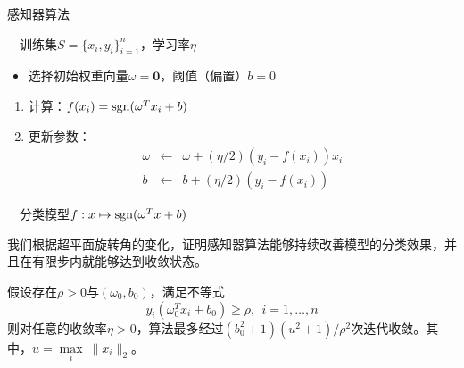 \begin{algorithm}[htbp]
        \caption{感知器算法}
        \begin{algorithmic}
            \REQUIRE ~~训练集$S=\{x_i,y_i\}_{i=1}^n$，学习率$\eta$ \\
            \STATE
            \begin{itemize}
              \item 选择初始权重向量$\omega=\mathbf{0}$，阈值（偏置）$b=0$
            \end{itemize}
            \REPEAT
            \STATE
            \begin{enumerate}
              \item 计算：$f(x_i) = \operatorname{\mathrm{sgn}}(\omega^T x_i + b)$
              \item 更新参数：
              \begin{equation}
                \begin{array}{lcl}
                  \omega & \leftarrow & \omega + (\eta/2) (y_i - f(x_i)) x_i\\
                  b & \leftarrow & b + (\eta/2) (y_i - f(x_i))
                \end{array}
              \end{equation}
            \end{enumerate}
            \ENDFOR
            \ENSURE ~~分类模型$f:x\mapsto \operatorname{\mathrm{sgn}}(\omega^T x + b)$
        \end{algorithmic}
\end{algorithm}

我们根据超平面旋转角的变化，证明感知器算法能够持续改善模型的分类效果，并且在有限步内就能够达到收敛状态。
\begin{theorem}
假设存在$\rho>0$与$(\omega_0,b_0)$，满足不等式
\begin{equation}
    y_i(\omega_0^T x_i + b_0) \ge \rho,~~i=1,\ldots,n
\end{equation}
则对任意的收敛率$\eta>0$，算法最多经过$(b_0^2+1)(u^2+1)/\rho^2$次迭代收敛。其中，$u=\max\limits_i~\|x_i\|_2$。
\end{theorem}

